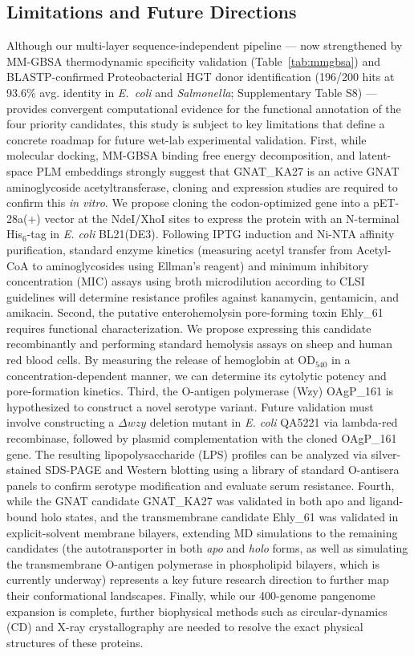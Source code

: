 \documentclass[pdflatex,sn-mathphys-num]{sn-jnl}
\begin{document}
\subsection{Limitations and Future Directions}
Although our multi-layer sequence-independent pipeline --- now strengthened by MM-GBSA thermodynamic specificity validation (Table~\ref{tab:mmgbsa}) and BLASTP-confirmed Proteobacterial HGT donor identification (196/200 hits at 93.6\% avg. identity in \textit{E.~coli} and \textit{Salmonella}; Supplementary Table S8) --- provides convergent computational evidence for the functional annotation of the four priority candidates, this study is subject to key limitations that define a concrete roadmap for future wet-lab experimental validation. First, while molecular docking, MM-GBSA binding free energy decomposition, and latent-space PLM embeddings strongly suggest that GNAT\_KA27 is an active GNAT aminoglycoside acetyltransferase, cloning and expression studies are required to confirm this \textit{in vitro}. We propose cloning the codon-optimized gene into a pET-28a(+) vector at the NdeI/XhoI sites to express the protein with an N-terminal His$_6$-tag in \textit{E. coli} BL21(DE3). Following IPTG induction and Ni-NTA affinity purification, standard enzyme kinetics (measuring acetyl transfer from Acetyl-CoA to aminoglycosides using Ellman's reagent) and minimum inhibitory concentration (MIC) assays using broth microdilution according to CLSI guidelines will determine resistance profiles against kanamycin, gentamicin, and amikacin. Second, the putative enterohemolysin pore-forming toxin Ehly\_61 requires functional characterization. We propose expressing this candidate recombinantly and performing standard hemolysis assays on sheep and human red blood cells. By measuring the release of hemoglobin at OD$_{540}$ in a concentration-dependent manner, we can determine its cytolytic potency and pore-formation kinetics. Third, the O-antigen polymerase (Wzy) OAgP\_161 is hypothesized to construct a novel serotype variant. Future validation must involve constructing a $\Delta wzy$ deletion mutant in \textit{E. coli} QA5221 via lambda-red recombinase, followed by plasmid complementation with the cloned OAgP\_161 gene. The resulting lipopolysaccharide (LPS) profiles can be analyzed via silver-stained SDS-PAGE and Western blotting using a library of standard O-antisera panels to confirm serotype modification and evaluate serum resistance. Fourth, while the GNAT candidate GNAT\_KA27 was validated in both apo and ligand-bound holo states, and the transmembrane candidate Ehly\_61 was validated in explicit-solvent membrane bilayers, extending MD simulations to the remaining candidates (the autotransporter in both \textit{apo} and \textit{holo} forms, as well as simulating the transmembrane O-antigen polymerase in phospholipid bilayers, which is currently underway) represents a key future research direction to further map their conformational landscapes. Finally, while our 400-genome pangenome expansion is complete, further biophysical methods such as circular-dynamics (CD) and X-ray crystallography are needed to resolve the exact physical structures of these proteins. 
\end{document}
